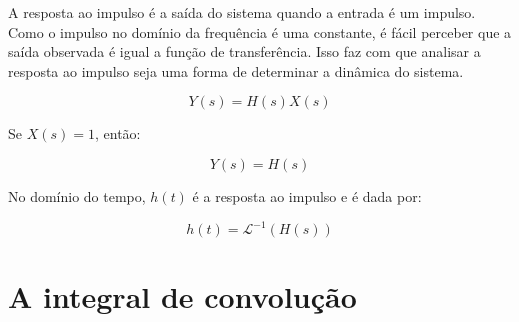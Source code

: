 \documentclass[12pt,fleqn]{book} %
\begin{document}
A resposta ao impulso é a saída do sistema quando a entrada é um impulso. Como o impulso no domínio da frequência é uma constante, é fácil perceber que a saída observada é igual a função de transferência. Isso faz com que analisar a resposta ao impulso seja uma forma de determinar a dinâmica do sistema. 

\begin{equation}
Y(s) = H(s)X(s)
\end{equation}

Se $X(s) = 1$, então:

\begin{equation}
Y(s) = H(s)
\end{equation}

No domínio do tempo, $h(t)$ é a resposta ao impulso e é dada por:

\begin{equation}
h(t) = \mathscr{L}^{-1}(H(s))
\end{equation}
    
	
\chapter{A integral de convolução}

   

\end{document}
